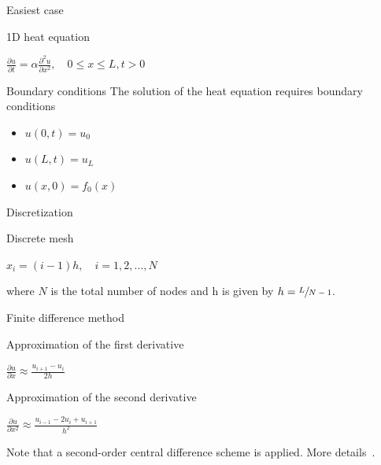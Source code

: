 \documentclass[\classoption]{beamer}
\begin{document}
\begin{frame}{Easiest case}


\begin{block}{1D heat equation}
\begin{center}
$ \frac{\partial u}{\partial t} = \alpha \frac{\partial^2 u}{\partial x^2}, \quad 0 \leq x \leq L, t >0 $
\end{center}
\end{block}

\begin{block}{Boundary conditions}
The solution of the heat equation requires boundary conditions
\begin{itemize}
\item $u(0,t) = u_0$
\item $u(L,t) = u_L$
\item $u(x,0) = f_0(x)$
\end{itemize}
\end{block}

\end{frame}

\begin{frame}{Discretization}

\begin{center}
\end{center}

\begin{block}{Discrete mesh}
\begin{center}
$x_i = (i-1) h, \quad i=1,2,\ldots,N$ 
\end{center}
where $N$ is the total number of nodes and h is given by $h=\sfrac{L}{N-1}$.
\end{block}

\end{frame}

\begin{frame}{Finite difference method}

\begin{block}{Approximation of the first derivative}
\begin{center}
$ \frac{\partial u}{\partial x} \approx \frac{u_{i+1}-u_{i}}{2h}$
\end{center}
\end{block}

\begin{block}{Approximation of the second derivative}
\begin{center}
$ \frac{\partial u}{\partial x^2} \approx \frac{u_{i-1}-2u_{i}+u_{i+1}}{h^2}$
\end{center}
\end{block}
Note that a second-order central difference scheme is applied. More details~\cite{strikwerda2004finite,leveque2007finite}.
\end{frame}
\end{document}
